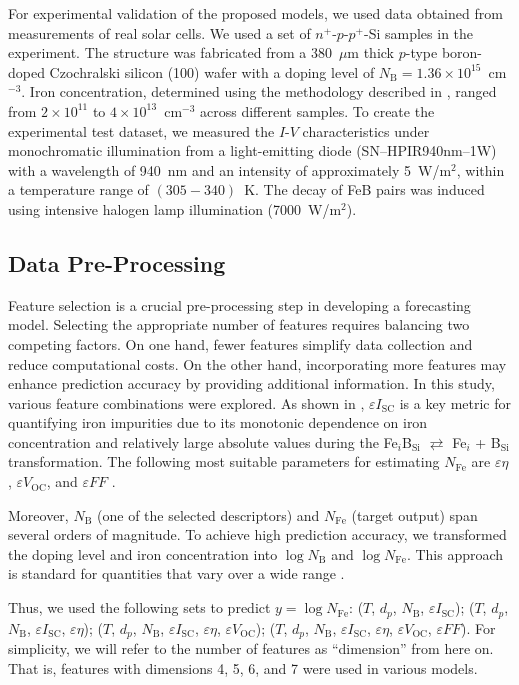 \documentclass[a4paper,fleqn]{cas-sc}
\begin{document}
For experimental validation of the proposed models, we used data obtained from measurements of real solar cells.
We used a set of $n^+$-$p$-$p^+$-Si samples in the experiment.
The structure was fabricated from a 380~$\mu$m thick $p$-type boron-doped Czochralski silicon (100) wafer 
with a doping level of $N_\mathrm{B}=1.36\times10^{15}$~cm$^{-3}$.
Iron concentration, determined using the methodology described in \cite{Olikh2022:JMatSci, Olikh2021JAP},
ranged from $2\times10^{11}$ to $4\times10^{13}$~cm$^{-3}$ across different samples.
To create the experimental test dataset, 
we measured the $I$-$V$ characteristics under monochromatic illumination from a light-emitting diode (SN–HPIR940nm–1W) 
with a wavelength of 940~nm and an intensity of approximately 5~W/m$^{2}$, within a temperature range of $(305-340)$~K.
The decay of FeB pairs was induced using intensive halogen lamp illumination (7000~W/m$^{2}$).



\subsection{Data Pre-Processing}

Feature selection is a crucial pre-processing step in developing a forecasting model.
Selecting the appropriate number of features requires balancing two competing factors.
On one hand, fewer features simplify data collection and reduce computational costs.
On the other hand, incorporating more features may enhance prediction accuracy by providing additional information.
In this study, various feature combinations were explored.
As shown in \cite{Olikh2025MSEB}, $\varepsilon I_\mathrm{SC}$ is a key metric for quantifying iron impurities 
due to its monotonic dependence on iron concentration and relatively large absolute values during the 
Fe$_i$B$_\mathrm{Si}$ $\rightleftarrows$ Fe$_i$ + B$_\mathrm{Si}$
transformation.
The following most suitable parameters for estimating $N_\mathrm{Fe}$ are 
$\varepsilon \eta$, $\varepsilon V_\mathrm{OC}$, and $\varepsilon F\!F$ \cite{Olikh2025MSEB}.

Moreover, $N_\mathrm{B}$ (one of the selected descriptors) and 
$N_\mathrm{Fe}$ (target output) span several orders of magnitude.
To achieve high prediction accuracy, we transformed the doping level and iron concentration into 
$\log N_\mathrm{B}$ and $\log N_\mathrm{Fe}$.
This approach is standard for quantities that vary over a wide range \cite{Srivastava2023, Minagawa2024}.

Thus, we used the following sets to predict $y = \log N_\mathrm{Fe}$:
($T$, $d_p$, $N_\mathrm{B}$, $\varepsilon I_\mathrm{SC}$);
($T$, $d_p$, $N_\mathrm{B}$, $\varepsilon I_\mathrm{SC}$, $\varepsilon \eta$);
($T$, $d_p$, $N_\mathrm{B}$, $\varepsilon I_\mathrm{SC}$, $\varepsilon \eta$, $\varepsilon V_\mathrm{OC}$);
($T$, $d_p$, $N_\mathrm{B}$, $\varepsilon I_\mathrm{SC}$, $\varepsilon \eta$, $\varepsilon V_\mathrm{OC}$, $\varepsilon F\!F$). 
For simplicity, we will refer to the number of features as ``dimension'' from here on.
That is, features with dimensions 4, 5, 6, and 7 were used in various models.
\end{document}
